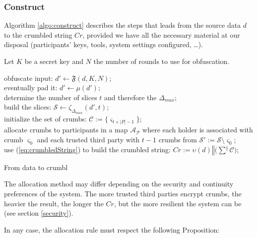 \documentclass[twoside,twocolumn]{article}
\theoremstyle{definition}
\theoremstyle{remark}
\begin{document}
\subsubsection{Construct}

Algorithm \ref{algo:construct} describes the steps that leads from the source data $d$ to the crumbled string $Cr$, provided we have all the necessary 
material at our disposal (participants' keys, tools, system settings configured, \dots).

Let $K$ be a secret key and $N$ the number of rounds to use for obfuscation.
\begin{algorithm}
    obfuscate input: $d' \gets \mathfrak{F}(d, K, N)$; \\
    eventually pad it: $d' \gets \mu(d')$; \\
    determine the number of slices $t$ and therefore the $\Delta_{max}$; \\
    build the slices: $\mathcal{S} \gets \zeta_{\Delta_{max}}(d', t)$; \\
    initialize the set of crumbs: $\mathcal{C} := \{ \varsigma_{t \times |P| - 1} \}$; \\
    allocate crumbs to participants in a map $\mathcal{A_P}$ where each holder is associated with crumb $\varsigma_0$ and each trusted third party with 
    $t - 1$ crumbs from $\mathcal{S}' := \mathcal{S} \setminus \varsigma_0$; \\
    use (\ref{eq:crumbledString}) to build the crumbled string: $Cr := \upsilon(d) \mathbin\Vert \Big( \sum^{\mathbin\Vert} \mathcal{C} \Big)$; \\
    \caption{From data to crumbl}
    \label{algo:construct}
\end{algorithm}

The allocation method may differ depending on the security and continuity preferences of the system.
The more trusted third parties encrypt crumbs, the heavier the result, the longer the $Cr$, but the more resilient the system can be (see section 
\ref{security}).

In any case, the allocation rule must respect the following Proposition:
\end{document}

